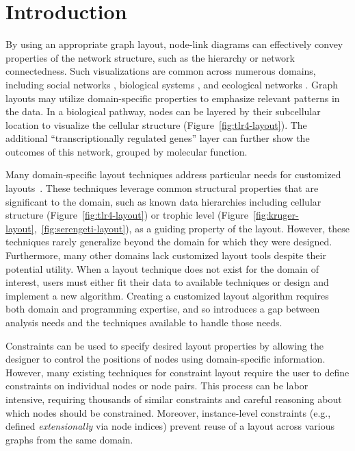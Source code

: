 \section{Introduction}
By using an appropriate graph layout, node-link diagrams can effectively 
convey properties of the network structure, such as the hierarchy or network connectedness. 
Such visualizations are common across numerous domains, including 
social networks \cite{scott1988social,rothenberg1998using,fitzpatrick2001preventable,mcelroy2003network,fu2011hiv},
biological systems \cite{barsky2008cerebral,shannon2003cytoscape,gehlenborg2010visualization,saraiya2005visualizing,becker2001graph,kojima2007efficient,li2005grid},
and ecological networks \cite{hinke2004visualizing,harper2006dynamic,lavigne1996cod,baskerville2011spatial,yodzis1998local,cohen2003ecological,kearney2016blog,benson2016higher,kruger2017}. 
Graph layouts may utilize domain-specific properties 
to emphasize relevant patterns in the data.
In a biological pathway, nodes can be layered by their
subcellular location to visualize the cellular structure
(Figure~\ref{fig:tlr4-layout}). The additional ``transcriptionally regulated genes'' layer
can further show the outcomes of this network, grouped by molecular function.

\tlrfourLayout

Many domain-specific layout techniques address particular needs
for customized layouts~\cite{barsky2008cerebral,genc2003constrained,shannon2003cytoscape,kearney2017d3,kearney2017ecopath}. These
techniques leverage common structural properties that are significant to the
domain, such as known data hierarchies including cellular 
structure (Figure~\ref{fig:tlr4-layout}) or trophic level
(Figure~\ref{fig:kruger-layout},~\ref{fig:serengeti-layout}), as a guiding property of the
layout. However, these techniques rarely generalize beyond the domain for
which they were designed. Furthermore, many
other domains lack customized layout tools despite their potential utility.
When a layout technique does not exist for the
domain of interest, users must either fit their data
to available techniques or design and implement a new algorithm.
Creating a customized layout algorithm requires both
domain and programming expertise, and so introduces a gap between 
analysis needs and the techniques available to handle those needs.

Constraints can be used to specify desired layout properties by
allowing the designer to control the positions of nodes using
domain-specific information.  However, many existing techniques
for constraint layout require the user to define constraints
on individual nodes or node pairs. This process can be labor
intensive, requiring thousands of similar constraints and careful reasoning
about which nodes should be constrained. Moreover, instance-level constraints 
(e.g., defined \emph{extensionally} via node indices) prevent
reuse of a layout across various graphs from the same domain.

